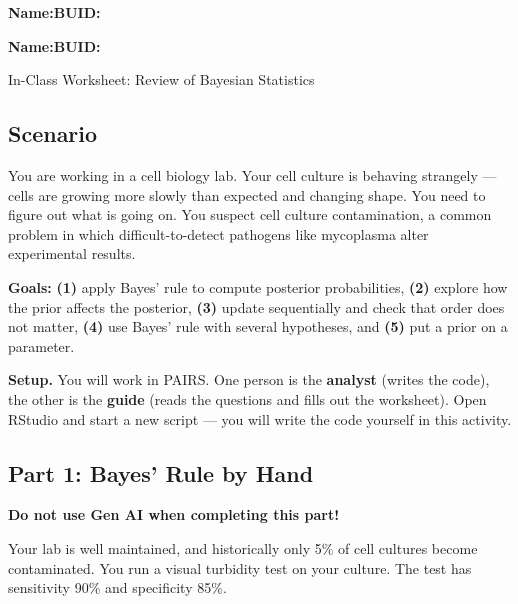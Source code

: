 \documentclass{article}
\newcommand{\blankline}[1]{\underline{\hspace{#1}}}
\begin{document}
\noindent\textbf{Name:}\blankline{2.25in}\hfill\textbf{BUID:}\blankline{1.55in}

\medskip

\noindent\textbf{Name:}\blankline{2.25in}\hfill\textbf{BUID:}\blankline{1.55in}\newline

\begin{center}
 \Large In-Class Worksheet: Review of Bayesian Statistics
\end{center}

\subsection*{Scenario}
You are working in a cell biology lab. Your cell culture is behaving strangely --- cells are growing more slowly than expected and changing shape. You need to figure out what is going on.
You suspect cell culture contamination, a common problem in which difficult-to-detect pathogens like mycoplasma alter experimental results.

\medskip
\noindent\textbf{Goals:}
\textbf{(1)} apply Bayes' rule to compute posterior probabilities,
\textbf{(2)} explore how the prior affects the posterior,
\textbf{(3)} update sequentially and check that order does not matter,
\textbf{(4)} use Bayes' rule with several hypotheses, and
\textbf{(5)} put a prior on a parameter.

\medskip
\noindent\textbf{Setup.} You will work in PAIRS. One person is the \textbf{analyst} (writes the code), the other is the \textbf{guide} (reads the questions and fills out the worksheet). Open RStudio and start a new script --- you will write the code yourself in this activity.

\subsection*{Part 1: Bayes' Rule by Hand}
\textbf{\color{red} Do not use Gen AI when completing this part!}

Your lab is well maintained, and historically only 5\% of cell cultures become contaminated. You run a visual turbidity test on your culture. The test has sensitivity 90\% and specificity 85\%.
\end{document}
